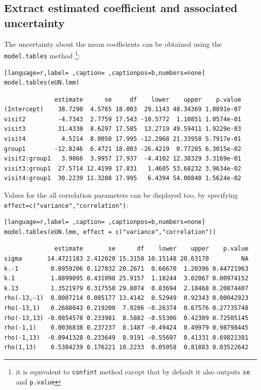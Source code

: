 \documentclass[12pt]{article}
\begin{document}
\subsection{Extract estimated coefficient and associated uncertainty}
\label{sec:org0be2873}

The uncertainty about the mean coefficients can be obtained using the
\texttt{model.tables} method \footnote{it is equivalent to \texttt{confint} method
except that by default it also outputs \texttt{se} and \texttt{p.value}}:
\begin{lstlisting}[language=r,label= ,caption= ,captionpos=b,numbers=none]
model.tables(eUN.lmm)
\end{lstlisting}

\begin{verbatim}
              estimate      se     df    lower    upper    p.value
(Intercept)    38.7290  4.5765 18.003  29.1143 48.34369 1.0891e-07
visit2         -4.7343  2.7759 17.543 -10.5772  1.10851 1.0574e-01
visit3         31.4330  8.6297 17.585  13.2719 49.59411 1.9229e-03
visit4          4.5214  8.0050 17.995 -12.2968 21.33958 5.7917e-01
group1        -12.8246  6.4721 18.003 -26.4219  0.77265 6.3015e-02
visit2:group1   3.9866  3.9957 17.937  -4.4102 12.38329 3.3169e-01
visit3:group1  27.5714 12.4199 17.831   1.4605 53.68232 3.9634e-02
visit4:group1  30.2239 11.3208 17.995   6.4394 54.00840 1.5624e-02
\end{verbatim}


Values for the all correlation parameters can be displayed
too, by specifying \texttt{effect=c("variance","correlation")}:
\begin{lstlisting}[language=r,label= ,caption= ,captionpos=b,numbers=none]
model.tables(eUN.lmm, effect = c("variance","correlation"))
\end{lstlisting}

\begin{verbatim}
              estimate       se      df    lower    upper    p.value
sigma       14.4721183 2.412020 15.3158 10.15148 20.63170         NA
k.-1         0.8959206 0.127032 20.2671  0.66670  1.20396 0.44721963
k.1          1.8899095 0.431098 25.9157  1.18244  3.02067 0.00974152
k.13         1.3521979 0.317550 29.8074  0.83694  2.18468 0.20874407
rho(-13,-1)  0.8007214 0.085177 13.4142  0.52949  0.92343 0.00042923
rho(-13,1)   0.2688043 0.219200  7.9286 -0.26374  0.67576 0.27735748
rho(-13,13) -0.0854578 0.233981  8.5882 -0.55306  0.42309 0.72505145
rho(-1,1)    0.0036838 0.237237  8.1487 -0.49424  0.49979 0.98798445
rho(-1,13)  -0.0941328 0.233649  8.9191 -0.55697  0.41331 0.69821381
rho(1,13)    0.5384239 0.176221 10.2233  0.05058  0.81883 0.03522642
\end{verbatim}
\end{document}
